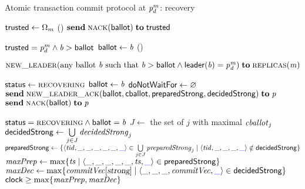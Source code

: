 
\begin{algorithm*}[t]
  \caption{Atomic transaction commit protocol at $\mathit{p}^{m}_{d}$: recovery}
  \label{alg:unistore-recovery}
  \begin{algorithmic}[1]
      \State ${\sf trusted} \gets \Omega_{m}$
        \recover()
      \Else{}
        ${\bf send}\; \textsc{nack}({\sf ballot}) \;{\bf to}\; {\sf trusted}$
      \EndIf
    \EndUpon

    \Statex
    \WhenRcv[\nack($b$)]
      \State \pre ${\sf trusted} = \mathit{p}^{m}_{d} \land \mathit{b} > {\sf ballot}$
      \hStatex
      \State ${\sf ballot} \gets \mathit{b}$
      \State \recover()
    \EndWhenRcv

    \Statex
    \Function{\recover}{\null}
      \label{line:function-recover}
      \State \send $\Call{\newleader}{\text{any ballot } \ballotvar
        \text{ such that } \ballotvar > \ballotVar
          \land \leaderof(\ballotvar) = \pvar^{\mvar}_{\dvar}}
          \sendto \replicas(\mvar)$
    \EndFunction

    \Statex
    \WhenRcv[$\newleader(\ballotvar) \from \pvar$]
      \label{line:function-newleader}
      \If{$\trustedVar = \pvar \land \ballotVar < \ballotvar$}
        \label{line:newleader-if}
        \State ${\sf status} \gets \textsc{recovering}$
          \label{line:newleader-status}
        \State ${\sf ballot} \gets \mathit{b}$
          \label{line:newleader-ballot}
        \State ${\sf doNotWaitFor} \gets \varnothing$
        \State $\send \Call{\newleaderack}{\ballotVar, \cballot,
          \preparedstrong, \decidedstrong} \sendto \pvar$
          \label{line:newleader-call-newleaderack}
      \Else{}
        $\send \Call{\nack}{\ballotVar} \sendto \pvar$
      \EndIf
    \EndWhenRcv

    \Statex
        \label{function:newleaderack}
      \State \pre ${\sf status} = \textsc{recovering} \land {\sf ballot} = \mathit{b}$
        \label{line:newleaderack-precondition}
      \hStatex
      \State \var $J \gets$ the set of $j$ with maximal $\mathit{cballot}_{j}$
        \label{line:newleaderack-J}
      \State ${\sf decidedStrong} \gets \bigcup\limits_{j \in J} \mathit{decidedStrong}_{j}$
        \label{line:newleaderack-decidedstrong}
      \State ${\sf preparedStrong} \gets \{\langle \mathit{tid}, \_, \_, \_, \_, \_, \textcolor{blue}{\_} \rangle
        \in \bigcup\limits_{j \in J} \mathit{preparedStrong}_{j} \mid
          \langle \mathit{tid}, \_, \_, \_, \textcolor{blue}{\_} \rangle \notin {\sf decidedStrong}\}$
        \label{line:newleaderack-preparedstrong}
      \State \var $\mathit{maxPrep} \gets \max\{\mathit{ts} \mid
        \langle \_, \_, \_, \_, \_, \mathit{ts}, \textcolor{blue}{\_} \rangle \in {\sf preparedStrong}\}$
        \label{line:newleaderack-maxprep}
      \State \var $\mathit{maxDec} \gets \max\{\mathit{commitVec}[\textsl{strong}] \mid
        \langle \_, \_, \_, \mathit{commitVec}, \textcolor{blue}{\_} \rangle \in {\sf decidedStrong}\}$
        \label{line:newleaderack-maxdec}
      \State \wait\until ${\sf clock} \ge \max\{\mathit{maxPrep}, \mathit{maxDec}\}$
        \label{line:newleaderack-wait-clock}


\end{algorithmic}
\end{algorithm*}
